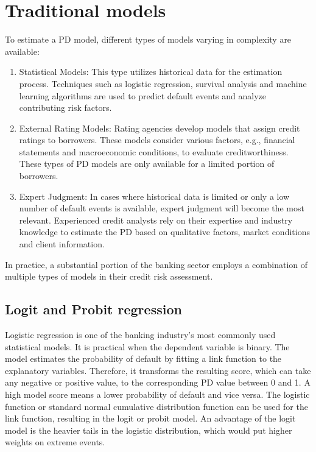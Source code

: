 \chapter{Traditional models}

To estimate a PD model, different types of models varying in complexity are available:

\begin{enumerate}
  \item Statistical Models: This type utilizes historical data for the estimation process. Techniques such as logistic regression, survival analysis and machine learning algorithms are used to predict default events and analyze contributing risk factors.
  \item External Rating Models: Rating agencies develop models that assign credit ratings to borrowers. These models consider various factors, e.g., financial statements and macroeconomic conditions, to evaluate creditworthiness. These types of PD models are only available for a limited portion of borrowers. 
  \item Expert Judgment: In cases where historical data is limited or only a low number of default events is available, expert judgment will become the most relevant. Experienced credit analysts rely on their expertise and industry knowledge to estimate the PD based on qualitative factors, market conditions and client information.
\end{enumerate}

In practice, a substantial portion of the banking sector employs a combination of multiple types of models in their credit risk assessment.

\section{Logit and Probit regression}
Logistic regression is one of the banking industry's most commonly used statistical models. It is practical when the dependent variable is binary. The model estimates the probability of default by fitting a link function to the explanatory variables. Therefore, it transforms the resulting score, which can take any negative or positive value, to the corresponding PD value between 0 and 1. A high model score means a lower probability of default and vice versa. The logistic function or standard normal cumulative distribution function can be used for the link function, resulting in the logit or probit model. An advantage of the logit model is the heavier tails in the logistic distribution, which would put higher weights on extreme events. \cite[pp.~40-42]{Witzany:2017}

